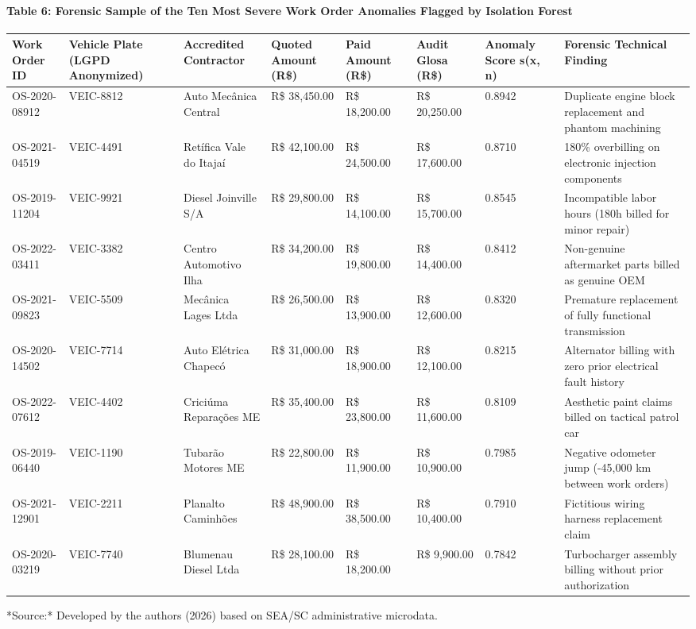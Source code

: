 \documentclass[10pt,a4paper,journal]{article}
\begin{document}
\paragraph{Table 6: Forensic Sample of the Ten Most Severe Work Order Anomalies Flagged by Isolation Forest}
\begin{table}[htbp]
\centering
\small
\begin{tabular}{llllllll}
\toprule
Work Order ID & Vehicle Plate (LGPD Anonymized) & Accredited Contractor & Quoted Amount (R\$) & Paid Amount (R\$) & Audit Glosa (R\$) & Anomaly Score s(x, n) & Forensic Technical Finding \\
\midrule
OS-2020-08912 & VEIC-8812 & Auto Mecânica Central & R\$ 38,450.00 & R\$ 18,200.00 & R\$ 20,250.00 & 0.8942 & Duplicate engine block replacement and phantom machining \\
OS-2021-04519 & VEIC-4491 & Retífica Vale do Itajaí & R\$ 42,100.00 & R\$ 24,500.00 & R\$ 17,600.00 & 0.8710 & 180\% overbilling on electronic injection components \\
OS-2019-11204 & VEIC-9921 & Diesel Joinville S/A & R\$ 29,800.00 & R\$ 14,100.00 & R\$ 15,700.00 & 0.8545 & Incompatible labor hours (180h billed for minor repair) \\
OS-2022-03411 & VEIC-3382 & Centro Automotivo Ilha & R\$ 34,200.00 & R\$ 19,800.00 & R\$ 14,400.00 & 0.8412 & Non-genuine aftermarket parts billed as genuine OEM \\
OS-2021-09823 & VEIC-5509 & Mecânica Lages Ltda & R\$ 26,500.00 & R\$ 13,900.00 & R\$ 12,600.00 & 0.8320 & Premature replacement of fully functional transmission \\
OS-2020-14502 & VEIC-7714 & Auto Elétrica Chapecó & R\$ 31,000.00 & R\$ 18,900.00 & R\$ 12,100.00 & 0.8215 & Alternator billing with zero prior electrical fault history \\
OS-2022-07612 & VEIC-4402 & Criciúma Reparações ME & R\$ 35,400.00 & R\$ 23,800.00 & R\$ 11,600.00 & 0.8109 & Aesthetic paint claims billed on tactical patrol car \\
OS-2019-06440 & VEIC-1190 & Tubarão Motores ME & R\$ 22,800.00 & R\$ 11,900.00 & R\$ 10,900.00 & 0.7985 & Negative odometer jump (-45,000 km between work orders) \\
OS-2021-12901 & VEIC-2211 & Planalto Caminhões & R\$ 48,900.00 & R\$ 38,500.00 & R\$ 10,400.00 & 0.7910 & Fictitious wiring harness replacement claim \\
OS-2020-03219 & VEIC-7740 & Blumenau Diesel Ltda & R\$ 28,100.00 & R\$ 18,200.00 & R\$ 9,900.00 & 0.7842 & Turbocharger assembly billing without prior authorization \\
\bottomrule
\end{tabular}
\end{table}
*Source:* Developed by the authors (2026) based on SEA/SC administrative microdata.
\end{document}
